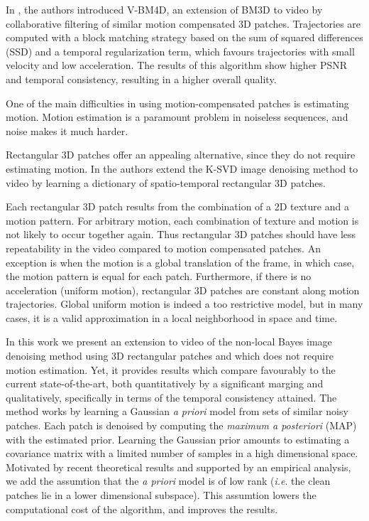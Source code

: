 \documentclass[10pt, journal, twocolumn, final, a4paper]{IEEEtran}
\newcommand{\ie}{\emph{i.e}. } \newcommand{\Ie}{\emph{I.e}. }
\begin{document}
In \cite{Maggioni2011,Maggioni2012}, the authors introduced V-BM4D, an
extension of BM3D to video by collaborative filtering of similar motion
compensated 3D patches. Trajectories are computed with a block matching
strategy based on the sum of squared differences (SSD) and a temporal
regularization term, which favours trajectories with small velocity and low
acceleration. The results of this algorithm show higher PSNR and temporal
consistency, resulting in a higher overall quality.

One of the main difficulties in using motion-compensated patches is estimating
motion. Motion estimation is a paramount problem in noiseless sequences, and
noise makes it much harder.

Rectangular 3D patches offer an appealing
alternative, since they do not require estimating motion. 
In \cite{Protter2007,Protter2009} the authors extend the K-SVD \cite{Elad2006}
image denoising method to video by learning a dictionary of spatio-temporal
rectangular 3D patches.

Each rectangular 3D patch results from the combination of a 2D texture and a
motion pattern. For arbitrary motion, each combination of texture and motion is
not likely to occur together again. Thus rectangular 3D patches should have
less repeatability in the video compared to motion compensated patches.  An
exception is when the motion is a global translation of the frame, in which
case, the motion pattern is equal for each patch. Furthermore, if there is no
acceleration (uniform motion), rectangular 3D patches are constant along motion
trajectories. Global uniform motion is indeed a too restrictive model, but in
many cases, it is a valid approximation in a local neighborhood in space and
time.

\bigskip

In this work we present an extension to video of the non-local Bayes image
denoising method \cite{Lebrun2013a,Lebrun2013ipol} using 3D rectangular
patches and which does not require motion estimation. Yet, it provides
results which compare favourably to the current state-of-the-art,
both quantitatively by a significant marging and qualitatively, specifically in
terms of the temporal consistency attained.
The method works by learning a Gaussian \emph{a priori} model from sets of 
similar noisy patches. Each patch is denoised by computing the \emph{maximum a
posteriori} (MAP) with the estimated prior.
Learning the Gaussian prior amounts to estimating a covariance matrix with a
limited number of samples in a high dimensional space. Motivated by recent 
theoretical results and supported by an empirical analysis, we add the 
assumtion that the \emph{a priori} model is of low rank (\ie the clean patches
lie in a lower dimensional subspace). This assumtion lowers the computational cost
of the algorithm, and improves the results.
\end{document}
